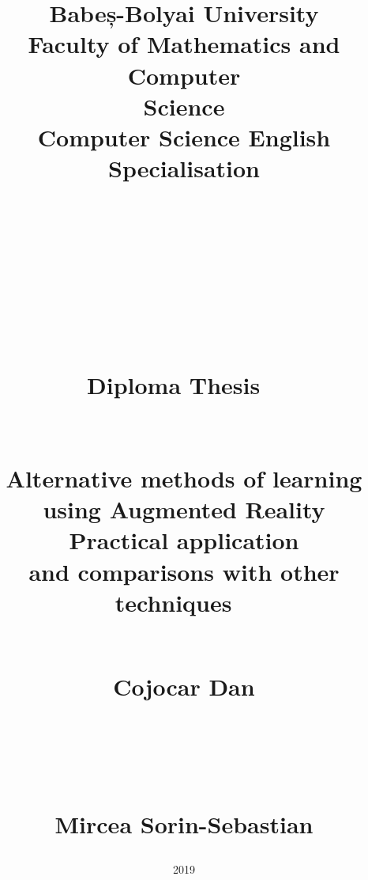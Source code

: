\documentclass[12 pct]{report}
\begin{document}
\begin{titlepage}
\title{%
  { \huge Babeș-Bolyai University\\
  Faculty of Mathematics and Computer\\
  Science\\
  Computer Science English Specialisation \\
  }
  \ \\
  \ \\
  \ \\
  \ \\
  \ \\
  \ \\
  {\huge Diploma Thesis}
  \ \\
  \ \\
  \ \\
  Alternative methods of learning using Augmented Reality\\
  Practical application \\
    and comparisons with other techniques
  \ \\
  \ \\
  {%
    \begin{flushleft}%
  	 Cojocar Dan
  	\end{flushleft}}
  \ \\
  \ \\
  {%
  \begin{flushright}
  	Mircea Sorin-Sebastian
  \end{flushright} }
}%
\date{2019\\}
\maketitle
\end{titlepage}
\end{document}
